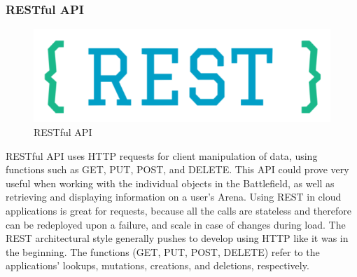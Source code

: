 \documentclass[12pt,a4paper]{report}
\begin{document}
			\subsubsection{RESTful API}
			\begin{figure}
				\includegraphics[scale=0.3]{restful}
				\caption{RESTful API}
				\label{fig: RESTful API)}
			\end{figure}
			RESTful API uses HTTP requests for client manipulation of data, using functions such as GET, PUT, POST, and DELETE. This API could prove very useful when working with the individual objects in the Battlefield, as well as retrieving and displaying information on a user's Arena. Using REST in cloud applications is great for requests, because all the calls are stateless and therefore can be redeployed upon a failure, and scale in case of changes during load. The REST architectural style generally pushes to develop using HTTP like it was in the beginning. The functions (GET, PUT, POST, DELETE) refer to the applications' lookups, mutations, creations, and deletions, respectively. \cite{rest}
			\newpage
\end{document}
